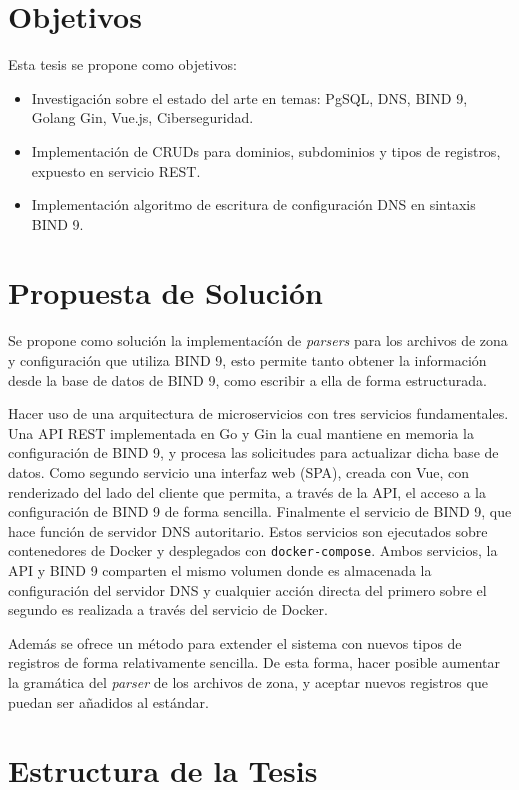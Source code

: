 \section{Objetivos}
Esta tesis se propone como objetivos:
\begin{itemize}
    \item Investigación sobre el estado del arte en temas: PgSQL, DNS, BIND 9, Golang Gin, Vue.js, Ciberseguridad.
    \item Implementación de CRUDs para dominios, subdominios y tipos de registros, expuesto en servicio REST.
    \item Implementación algoritmo de escritura de configuración DNS en sintaxis BIND 9.
\end{itemize}



\section{Propuesta de Solución}

Se propone como solución la implementacíón de \textit{parsers} para los archivos de zona y configuración que utiliza BIND 9, esto permite tanto obtener la información desde la base de datos de BIND 9, como escribir a ella de forma estructurada.

Hacer uso de una arquitectura de microservicios con tres servicios fundamentales. Una API REST implementada en Go y Gin la cual mantiene en memoria la configuración de BIND 9,  y procesa las solicitudes para actualizar dicha base de datos. Como segundo servicio una interfaz web (SPA), creada con Vue, con renderizado del lado del cliente que permita, a través de la API, el acceso a la configuración de BIND 9 de forma sencilla. Finalmente el servicio de BIND 9, que hace función de servidor DNS autoritario. Estos servicios son ejecutados sobre contenedores de Docker y desplegados con \verb+docker-compose+. Ambos servicios, la API y BIND 9 comparten el mismo volumen donde es almacenada la configuración del servidor DNS y cualquier acción directa del primero sobre el segundo es realizada a través del servicio de Docker.

Además se ofrece un método para extender el sistema con nuevos tipos de registros de forma relativamente sencilla. De esta forma, hacer posible aumentar la gramática del \textit{parser} de los archivos de zona, y aceptar nuevos registros que puedan ser añadidos al estándar.

\section{Estructura de la Tesis}
